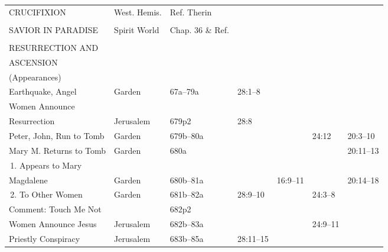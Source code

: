 \begin{longtable}[h]{l@{\hspace{0.5em}}l@{\hspace{0.5em}}l@{\hspace{0.5em}}BBBB}
\qquad CRUCIFIXION                         & West. Hemis.        & Ref. Therin        &                   &                    &                       & \\
\\
SAVIOR IN PARADISE                         & Spirit World        & Chap. 36 \& Ref.   &                   &                    &                       & \\
\\
RESURRECTION AND \\ \qquad ASCENSION       &                     &                    &                   &                    &                       & \\
\qquad (Appearances)                       &                     &                    &                   &                    &                       & \\
\quad Earthquake, Angel                    & Garden              & 67a--79a           & 28:1--8           &                    &                       & \\
\quad Women Announce\\\qquad Resurrection  & Jerusalem           & 679p2              & 28:8              &                    &                       & \\
\quad Peter, John, Run to Tomb             & Garden              & 679b--80a          &                   &                    & 24:12                 & 20:3--10 \\
\quad Mary M. Returns to Tomb              & Garden              & 680a               &                   &                    &                       & 20:11--13 \\
\,1. Appears to Mary\\\qquad Magdalene     & Garden              & 680b--81a          &                   & 16:9--11           &                       & 20:14--18 \\
\,2. To Other Women                        & Garden              & 681b--82a          & 28:9--10          &                    & 24:3--8               & \\
\quad Comment: Touch Me Not                &                     & 682p2              &                   &                    &                       & \\
\quad Women Announce Jesus                 & Jerusalem           & 682b--83a          &                   &                    & 24:9--11              & \\
\quad Priestly Conspiracy                  & Jerusalem           & 683b--85a          & 28:11--15         &                    &                       & \\

\end{longtable}

